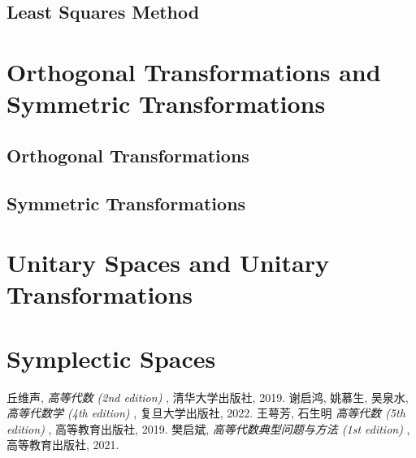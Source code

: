 \documentclass[11pt]{elegantbook}
\begin{document}
\subsection{Least Squares Method}

\section{Orthogonal Transformations and Symmetric Transformations}
\subsection{Orthogonal Transformations}

\subsection{Symmetric Transformations}

\section{Unitary Spaces and Unitary Transformations}

\section{Symplectic Spaces}

\begin{thebibliography}{99} 
 丘维声, \emph{ 高等代数 (2nd edition) }, 清华大学出版社, 2019. 
 谢启鸿, 姚慕生, 吴泉水, \emph{ 高等代数学 (4th edition) }, 复旦大学出版社, 2022.
 王萼芳, 石生明 \emph{ 高等代数 (5th edition) }, 高等教育出版社, 2019.
 樊启斌, \emph{ 高等代数典型问题与方法 (1st edition) }, 高等教育出版社, 2021.
\end{thebibliography}
\end{document}
